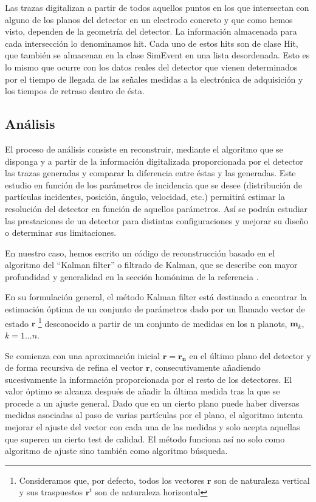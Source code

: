 \documentclass[a4paper]{article}
\let\vec\mathbf  %
\begin{document}
Las trazas digitalizan a partir de todos aquellos puntos en los que intersectan con alguno de los planos del detector en un electrodo concreto y que como hemos visto, dependen de la geometría del detector. La información almacenada para cada intersección lo denominamos hit. Cada uno de estos hits son de clase Hit, que también se almacenan en la clase SimEvent en una lista desordenada. Esto es lo mismo que ocurre con los datos reales del detector que vienen determinados por el tiempo de llegada de las señales medidas a la electrónica de adquisición y los tiempos de retraso dentro de ésta. 

\subsection{Análisis}

El proceso de análisis consiste en reconstruir, mediante el algoritmo que se disponga y a partir de la información digitalizada proporcionada por el detector las trazas generadas y comparar la diferencia entre éstas y las generadas. Este estudio en función de los parámetros de incidencia que se desee (distribución de partículas incidentes, posición, ángulo, velocidad, etc.) permitirá estimar la resolución del detector en función de aquellos parámetros.  Así se podrán estudiar las prestaciones de un detector para distintas configuraciones y mejorar su diseño o determinar sus limitaciones.

En nuestro caso,  hemos escrito un código de reconstrucción basado  en el algoritmo del ``Kalman filter'' o filtrado de Kalman, que se describe con mayor profundidad y generalidad en la sección homónima de la referencia \cite{joaneh}.

En su formulación general, el método Kalman filter está destinado a encontrar la estimación óptima de un conjunto de parámetros dado por un llamado vector de estado $\vec{r}$ \footnote{Consideramos que, por defecto, todos los vectores  $\vec{r}$ son de naturaleza vertical y sus traspuestos  $\vec{r}^t$ son de naturaleza horizontal} desconocido a partir de un conjunto de medidas en los n planots, $\vec{m}_k$, $k = 1 ... n$.

Se comienza con una aproximación inicial $\vec{r} = \vec{r_n}$ en el último plano del detector y de forma recursiva de refina el vector $\vec{r}$, consecutivamente añadiendo sucesivamente la información proporcionada por el resto de los detectores. El valor óptimo se alcanza después de añadir la última medida tras la que se procede a un ajuste general. Dado que en un cierto plano puede haber diversas medidas asociadas al paso de varias partículas por el plano, el algoritmo intenta mejorar el ajuste del vector con cada una de las medidas y solo acepta aquellas que superen un cierto test de calidad. El método funciona así no solo como algoritmo de ajuste sino también como algoritmo búsqueda. 
\end{document}
